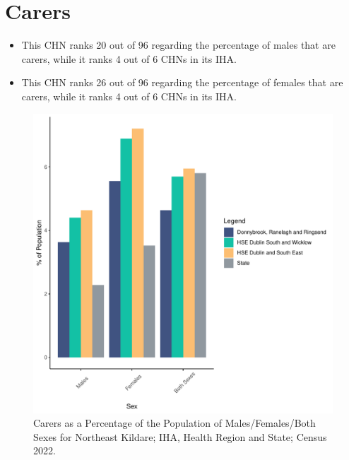 \documentclass{article}
\begin{document}
\section{Carers}\label{sect:Carers}
\begin{itemize}
\item This CHN ranks  20 out of 96 regarding the percentage of males that are carers, while it ranks   4 out of 6 CHNs in its IHA.
\item This CHN ranks  26 out of 96 regarding the percentage of females that are carers, while it ranks   4 out of 6 CHNs in its IHA.
\end{itemize}
\begin{figure}[H]
	\centering
	\includegraphics[width = 150mm]{../figures/CareED.pdf}
	\caption{Carers as a Percentage of the Population of Males/Females/Both Sexes for Northeast Kildare; IHA, Health Region and State; Census 2022.}
	\label{fig:2ae19629-1a6a-13a3-e055-000000000001}
	\end{figure}
\end{document}
